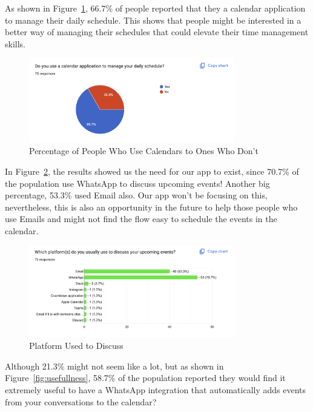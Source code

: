 \documentclass[12pt,a4paper,twoside]{report}
\begin{document}
As shown in Figure~\ref{fig:use-calendar}, 66.7\% of people reported that they a calendar application to manage their daily schedule. This shows that people might be interested in a better way of managing their schedules that could elevate their time management skills.

\begin{figure}[!h]
    \centering
    \includegraphics[width=0.8\textwidth]{images/survey/use-calendar.png}
    \caption{Percentage of People Who Use Calendars to Ones Who Don't}
    \label{fig:use-calendar}
\end{figure}

In Figure~\ref{fig:platform-to-discuss}, the results showed us the need for our app to exist, since 70.7\% of the population use WhatsApp to discuss upcoming events! Another big percentage, 53.3\% used Email also. Our app won't be focusing on this, nevertheless, this is also an opportunity in the future to help those people who use Emails and might not find the flow easy to schedule the events in the calendar.

\begin{figure}[!h]
    \centering
    \includegraphics[width=0.8\textwidth]{images/survey/platform-to-discuss.png}
    \caption{Platform Used to Discuss}
    \label{fig:platform-to-discuss}
\end{figure}

Although 21.3\% might not seem like a lot, but as shown in Figure~\ref{fig:usefullness}, 58.7\% of the population reported they would find it extremely useful to have a WhatsApp integration that automatically adds events from your conversations to the calendar?
\end{document}
